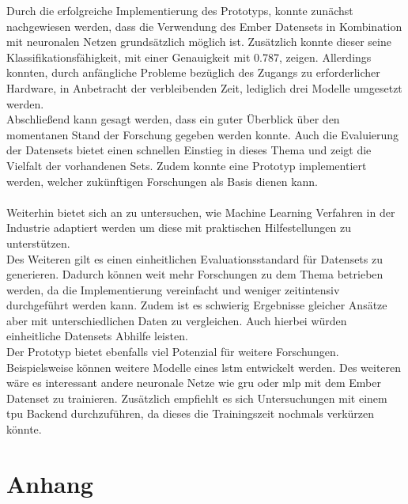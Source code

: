 \documentclass[
    12pt, %
    DIV10,
    ngerman, %
    a4paper, %
    oneside, %
    titlepage, %
    parskip=half, %
    headings=normal, %
    listof=totoc, %
    bibliography=totoc, %
    index=totoc, %
    captions=tableheading, %
    final %
]{scrreprt}
\begin{document}
Durch die erfolgreiche Implementierung des Prototyps, konnte zunächst nachgewiesen werden, dass die Verwendung des Ember Datensets in Kombination mit neuronalen Netzen grundsätzlich möglich ist. Zusätzlich konnte dieser seine Klassifikationsfähigkeit, mit einer Genauigkeit mit 0.787, zeigen. Allerdings konnten, durch anfängliche Probleme bezüglich des Zugangs zu erforderlicher Hardware, in Anbetracht der verbleibenden Zeit, lediglich drei Modelle umgesetzt werden.\\
Abschlie{\ss}end kann gesagt werden, dass ein guter Überblick über den momentanen Stand der Forschung gegeben werden konnte. Auch die Evaluierung der Datensets bietet einen schnellen Einstieg in dieses Thema und zeigt die Vielfalt der vorhandenen Sets. Zudem konnte eine Prototyp implementiert werden, welcher zukünftigen Forschungen als Basis dienen kann.
\\\\
Weiterhin bietet sich an zu untersuchen, wie Machine Learning Verfahren in der Industrie adaptiert werden um diese mit praktischen Hilfestellungen zu unterstützen.\\ Des Weiteren gilt es einen einheitlichen Evaluationsstandard für Datensets zu generieren. Dadurch können weit mehr Forschungen zu dem Thema betrieben werden, da die Implementierung vereinfacht und weniger zeitintensiv durchgeführt werden kann. Zudem ist es schwierig Ergebnisse gleicher Ansätze aber mit unterschiedlichen Daten zu vergleichen. Auch hierbei würden einheitliche Datensets Abhilfe leisten.\\
Der Prototyp bietet ebenfalls viel Potenzial für weitere Forschungen. Beispielsweise können weitere Modelle eines \ac{lstm} entwickelt werden. Des weiteren wäre es interessant andere neuronale Netze wie \ac{gru} oder \ac{mlp} mit dem Ember Datenset zu trainieren. Zusätzlich empfiehlt es sich Untersuchungen mit einem \ac{tpu} Backend durchzuführen, da dieses die Trainingszeit nochmals verkürzen könnte.

\newpage
{}
%
%
\printbibheading[heading=bibnumbered]
%
%
\printbibliography[notkeyword=internet, heading=subbibliography, %
   title={Bücher und Journals}]
\printbibliography[keyword=internet, heading=subbibliography, %
   title={Internetquellen}]

\appendix
\newpage
\chapter{Anhang}
\end{document}
